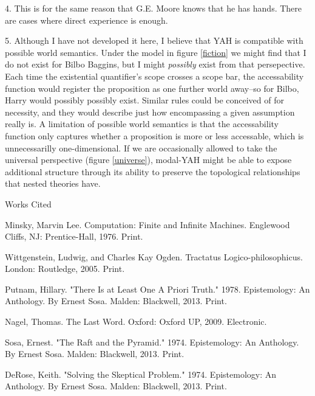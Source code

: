 \documentclass[12pt]{article}
\newcommand{\bibent}{\noindent \hangindent 40pt}
\newenvironment{workscited}{\newpage \begin{center} Works Cited \end{center}}{\newpage }
\begin{document}
\begin{flushleft}
4. This is for the same reason that G.E. Moore knows that he has hands.  There are cases where direct experience is enough.

5. Although I have not developed it here, I believe that YAH is compatible with possible world semantics.  Under the model in figure \ref{fiction} we might find that I do not exist for Bilbo Baggins, but I might \textit{possibly} exist from that persepective.  Each time the existential quantifier's scope crosses a scope bar, the accessability function would register the proposition as one further world away--so for Bilbo, Harry would possibly possibly exist.  Similar rules could be conceived of for necessity, and they would describe just how encompassing a given assumption really is.  A limitation of possible world semantics is that the accessability function only captures whether a proposition is more or less accessable, which is unnecessarilly one-dimensional.  If we are occasionally allowed to take the universal perspective (figure \ref{universe}), modal-YAH might be able to expose additional structure through its ability to preserve the topological relationships that nested theories have.



\begin{workscited}
    \bibent Minsky, Marvin Lee. Computation: Finite and Infinite Machines. Englewood Cliffs, NJ: Prentice-Hall, 1976. Print.

    \bibent Wittgenstein, Ludwig, and Charles Kay Ogden. Tractatus Logico-philosophicus. London: Routledge, 2005. Print.

    \bibent Putnam, Hillary. "There Is at Least One A Priori Truth." 1978. Epistemology: An Anthology. By Ernest Sosa. Malden: Blackwell, 2013. Print.

    \bibent Nagel, Thomas. The Last Word. Oxford: Oxford UP, 2009. Electronic.

    \bibent Sosa, Ernest. "The Raft and the Pyramid." 1974. Epistemology: An Anthology. By Ernest Sosa. Malden: Blackwell, 2013. Print.

    \bibent DeRose, Keith. "Solving the Skeptical Problem." 1974. Epistemology: An Anthology. By Ernest Sosa. Malden: Blackwell, 2013. Print.


\end{workscited}

\end{flushleft}
\end{document}
